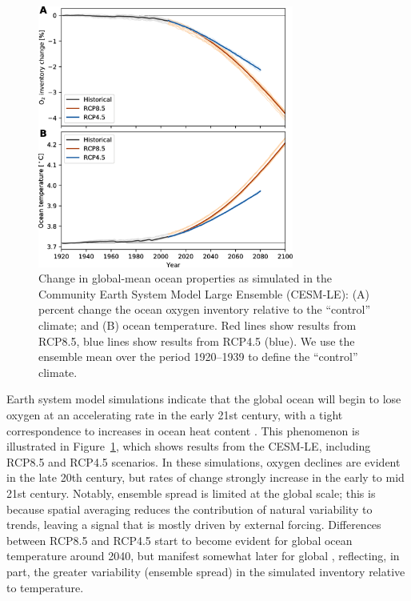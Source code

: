 \documentclass{report_chapter}
\begin{document}
\begin{figure}[tbp]
\centering
\includegraphics[width=0.75\textwidth]{cesm-global-timeseries.png}
\caption{Change in global-mean ocean properties as simulated in the Community Earth System Model Large Ensemble (CESM-LE): (A) percent change the ocean oxygen inventory relative to the ``control'' climate; and (B) ocean temperature.
Red lines show results from RCP8.5, blue lines show results from RCP4.5 (blue).
We use the ensemble mean over the period 1920--1939 to define the ``control'' climate.}
\label{fig:cesm-global-timeseries}
\end{figure}

Earth system model simulations indicate that the global ocean will begin to lose oxygen at an accelerating rate in the early 21st century, with a tight correspondence to increases in ocean heat content \citep{Bopp-Resplandy-etal-2013}.
This phenomenon is illustrated in Figure~\ref{fig:cesm-global-timeseries}, which shows results from the CESM-LE, including RCP8.5 and RCP4.5 scenarios.
In these simulations, oxygen declines are evident in the late 20th century, but rates of change strongly increase in the early to mid 21st century.
Notably, ensemble spread is limited at the global scale; this is because spatial averaging reduces the contribution of natural variability to trends, leaving a signal that is mostly driven by external forcing.
Differences between RCP8.5 and RCP4.5 start to become evident for global ocean temperature around 2040, but manifest somewhat later for global \OO{}, reflecting, in part, the greater variability (ensemble spread) in the simulated \OO{} inventory relative to temperature.
\end{document}
